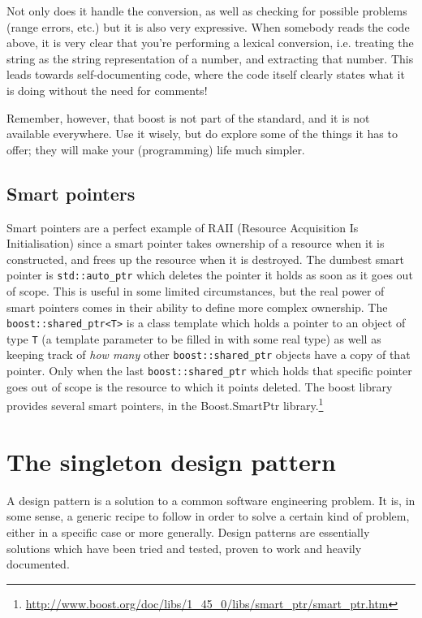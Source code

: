 \documentclass[a4paper]{scrartcl}
\begin{document}
Not only does it handle the conversion, as well as checking for possible problems (range errors, etc.) but it is also very expressive. When somebody reads the code above, it is very clear that you're performing a lexical conversion, i.e. treating the string as the string representation of a number, and extracting that number. This leads towards self-documenting code, where the code itself clearly states what it is doing without the need for comments!

Remember, however, that boost is not part of the standard, and it is not available everywhere. Use it wisely, but do explore some of the things it has to offer; they will make your (programming) life much simpler.

\subsection{Smart pointers}\label{sec:boost_smart_ptr}
Smart pointers are a perfect example of RAII (Resource Acquisition Is Initialisation) since a smart pointer takes ownership of a resource when it is constructed, and frees up the resource when it is destroyed. The dumbest smart pointer is \verb|std::auto_ptr| which deletes the pointer it holds as soon as it goes out of scope. This is useful in some limited circumstances, but the real power of smart pointers comes in their ability to define more complex ownership. The \verb|boost::shared_ptr<T>| is a class template which holds a pointer to an object of type \verb|T| (a template parameter to be filled in with some real type) as well as keeping track of \emph{how many} other \verb|boost::shared_ptr| objects have a copy of that pointer. Only when the last \verb|boost::shared_ptr| which holds that specific pointer goes out of scope is the resource to which it points deleted. The boost library provides several smart pointers, in the Boost.SmartPtr library.\footnote{\url{http://www.boost.org/doc/libs/1_45_0/libs/smart_ptr/smart_ptr.htm}}

\section{The singleton design pattern}\label{sec:singleton}
A design pattern is a solution to a common software engineering problem. It is, in some sense, a generic recipe to follow in order to solve a certain kind of problem, either in a specific case or more generally. Design patterns are essentially solutions which have been tried and tested, proven to work and heavily documented.
\end{document}
